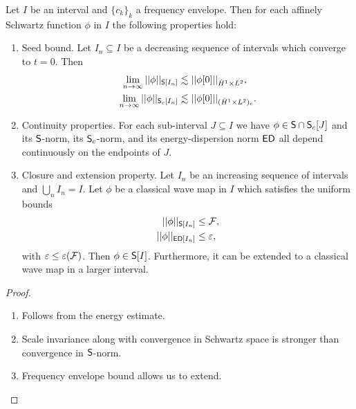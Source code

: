 \begin{lemma}
	Let $I$ be an interval and $\{ c_k \}_k$ a frequency envelope. Then for each affinely Schwartz function $\phi$ in $I$ the following properties hold:
	\begin{enumerate}
		\item Seed bound. Let $I_n \subseteq I$ be a decreasing sequence of intervals which converge to $t = 0$. Then 
			\begin{align*}
				\lim_{n \to \infty} ||\phi||_{\mathsf S[I_n]}
					&\lesssim ||\phi[0]||_{\dot H^1 \times L^2},  \\
				\lim_{n \to \infty} ||\phi||_{\mathsf S_c [I_n]}
					&\lesssim ||\phi[0]||_{(\dot H^1 \times L^2)_c}. 	
			\end{align*}		
			
		\item Continuity properties. For each sub-interval $J \subseteq I$ we have $\phi \in \mathsf S \cap \mathsf S_c [J]$ and its $\mathsf S$-norm, its $\mathsf S_c$-norm, and its energy-dispersion norm $\mathsf{ED}$ all depend continuously on the endpoints of $J$. 
		
		\item Closure and extension property. Let $I_n$ be an increasing sequence of intervals and $\bigcup_n I_n = I$. Let $\phi$ be a classical wave map in $I$ which satisfies the uniform bounds 
			\begin{align*}
				||\phi||_{\mathsf S[I_n]} 
					&\leq \mathcal F, \\
				||\phi||_{\mathsf{ED} [I_n]} 
					&\leq \varepsilon,
			\end{align*}		
			with $\varepsilon \leq \varepsilon(\mathcal F)$. Then $\phi \in \mathsf S[I]$. Furthermore, it can be extended to a classical wave map in a larger interval. 
	\end{enumerate}
\end{lemma}

\begin{proof}
\leavevmode
\begin{enumerate}
	\item Follows from the energy estimate. 
	
	\item Scale invariance along with convergence in Schwartz space is stronger than convergence in $\mathsf S$-norm. 
	
	\item Frequency envelope bound allows us to extend. 
\end{enumerate}
\end{proof}



